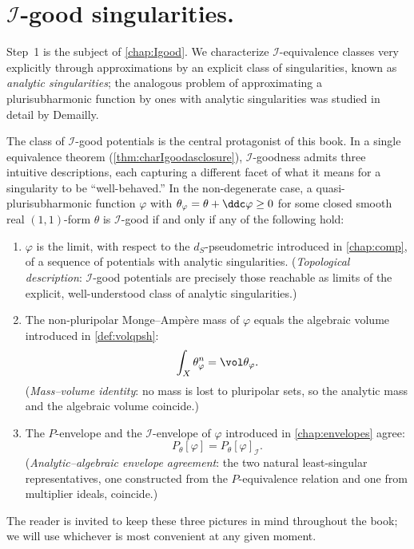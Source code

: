 \section*{$\mathcal{I}$-good singularities.}
Step~1 is the subject of \cref{chap:Igood}. We characterize $\mathcal{I}$-equivalence classes very explicitly through approximations by an explicit class of singularities, known as \emph{analytic singularities}; the analogous problem of approximating a plurisubharmonic function by ones with analytic singularities was studied in detail by Demailly.

The class of $\mathcal{I}$-good potentials is the central protagonist of this book. In a single equivalence theorem (\cref{thm:charIgoodasclosure}), $\mathcal{I}$-goodness admits three intuitive descriptions, each capturing a different facet of what it means for a singularity to be ``well-behaved.'' In the non-degenerate case, a quasi-plurisubharmonic function $\varphi$ with $\theta_{\varphi}=\theta+\ddc\varphi\geq 0$ for some closed smooth real $(1,1)$-form $\theta$ is $\mathcal{I}$-good if and only if any of the following hold:
\begin{enumerate}
    \item\label{itm:preface:L45:1} $\varphi$ is the limit, with respect to the $d_S$-pseudometric introduced in \cref{chap:comp}, of a sequence of potentials with analytic singularities. (\emph{Topological description}: $\mathcal{I}$-good potentials are precisely those reachable as limits of the explicit, well-understood class of analytic singularities.)
    \item\label{itm:preface:L45:2} The non-pluripolar Monge--Amp\`ere mass of $\varphi$ equals the algebraic volume introduced in \cref{def:volqpsh}:
    \[
        \int_X \theta_\varphi^n = \vol\theta_\varphi.
    \]
    (\emph{Mass--volume identity}: no mass is lost to pluripolar sets, so the analytic mass and the algebraic volume coincide.)
    \item\label{itm:preface:L45:3} The $P$-envelope and the $\mathcal{I}$-envelope of $\varphi$ introduced in \cref{chap:envelopes} agree:
    \[
        P_\theta[\varphi] = P_\theta[\varphi]_{\mathcal{I}}.
    \]
    (\emph{Analytic--algebraic envelope agreement}: the two natural least-singular representatives, one constructed from the $P$-equivalence relation and one from multiplier ideals, coincide.)
\end{enumerate}
The reader is invited to keep these three pictures in mind throughout the book; we will use whichever is most convenient at any given moment.

